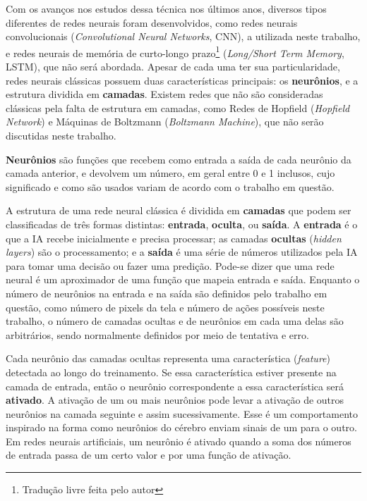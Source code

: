 Com os avanços nos estudos dessa técnica nos últimos anos, diversos tipos diferentes de redes neurais foram desenvolvidos, como redes neurais convolucionais (\textit{Convolutional Neural Networks}, CNN), a utilizada neste trabalho, e redes neurais de memória de curto-longo prazo\footnote{Tradução livre feita pelo autor} (\textit{Long/Short Term Memory}, LSTM), que não será abordada.
Apesar de cada uma ter sua particularidade, redes neurais clássicas possuem duas características principais: os \textbf{neurônios}, e a estrutura dividida em \textbf{camadas}.
Existem redes que não são consideradas clássicas pela falta de estrutura em camadas, como Redes de Hopfield (\textit{Hopfield Network}) e Máquinas de Boltzmann (\textit{Boltzmann Machine}), que não serão discutidas neste trabalho.

\textbf{Neurônios} são funções que recebem como entrada a saída de cada neurônio da camada anterior, e devolvem um número, em geral entre 0 e 1 inclusos, cujo significado e como são usados variam de acordo com o trabalho em questão.

A estrutura de uma rede neural clássica é dividida em \textbf{camadas} que podem ser classificadas de três formas distintas: \textbf{entrada}, \textbf{oculta}, ou \textbf{saída}.
A \textbf{entrada} é o que a IA recebe inicialmente e precisa processar; as camadas \textbf{ocultas} (\textit{hidden layers}) são o processamento; e a \textbf{saída} é uma série de números utilizados pela IA para tomar uma decisão ou fazer uma predição.
Pode-se dizer que uma rede neural é um aproximador de uma função que mapeia entrada e saída.
Enquanto o número de neurônios na entrada e na saída são definidos pelo trabalho em questão, como número de pixels da tela e número de ações possíveis neste trabalho, o número de camadas ocultas e de neurônios em cada uma delas são arbitrários, sendo normalmente definidos por meio de tentativa e erro.

Cada neurônio das camadas ocultas representa uma característica (\textit{feature}) detectada ao longo do treinamento.
Se essa característica estiver presente na camada de entrada, então o neurônio correspondente a essa característica será \textbf{ativado}.
A ativação de um ou mais neurônios pode levar a ativação de outros neurônios na camada seguinte e assim sucessivamente. Esse é um comportamento inspirado na forma como neurônios do cérebro enviam sinais de um para o outro.
Em redes neurais artificiais, um neurônio é ativado quando a soma dos números de entrada passa de um certo valor e por uma função de ativação.

